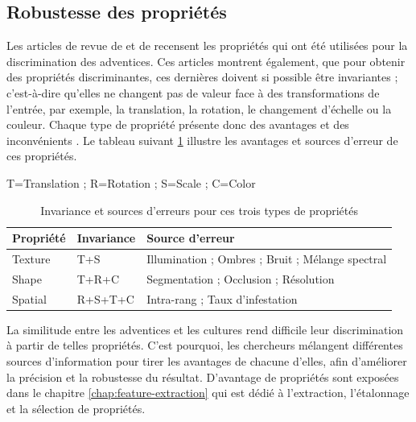 \documentclass[../thesis.tex]{subfiles}
\begin{document}
    \newpage
    \subsection{Robustesse des propriétés}
    
    
    Les articles de revue de \cite{wu2021review} et de \cite{smartcities3030039} recensent les propriétés qui ont été utilisées pour la discrimination des adventices. Ces articles montrent également, que pour obtenir des propriétés discriminantes, ces dernières doivent si possible être invariantes ; c'est-à-dire qu'elles ne changent pas de valeur face à des transformations de l'entrée, par exemple, la translation, la rotation, le changement d'échelle ou la couleur. Chaque type de propriété présente donc des avantages et des inconvénients \cite{wu2021review}. Le tableau suivant \ref{tab:03-feature-invariance} illustre les avantages et sources d'erreur de ces propriétés.
    
    \begin{table}[H]
        \centering
        {\scriptsize T=Translation ; R=Rotation ; S=Scale ; C=Color } \\
        \begin{tabularx}{\linewidth}{l l X}
            \hline
            Propriété & Invariance & Source d'erreur \\
            \hline
            Texture & T+S 		& Illumination ; Ombres ; Bruit ; Mélange spectral \\
            Shape 	& T+R+C 	  	& Segmentation ; Occlusion ; Résolution \\
            Spatial & R+S+T+C	& Intra-rang ; Taux d'infestation \\
            \hline
        \end{tabularx}
        \caption{Invariance et sources d'erreurs pour ces trois types de propriétés}
        \label{tab:03-feature-invariance}
    \end{table}
    
    La similitude entre les adventices et les cultures rend difficile leur discrimination à partir de telles propriétés. C'est pourquoi, les chercheurs mélangent différentes sources d'information pour tirer les avantages de chacune d'elles, afin d'améliorer la précision et la robustesse du résultat. D'avantage de propriétés sont exposées dans le chapitre \ref{chap:feature-extraction} qui est dédié à l'extraction, l'étalonnage et la sélection de propriétés.
    
\end{document}
